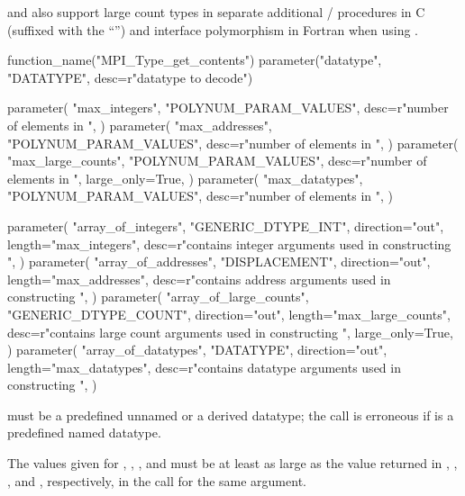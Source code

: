  and  also support large \gb{}count types in
separate additional \MPI/ procedures in C (suffixed with the ``'') and interface
polymorphism  in Fortran when using .

%
\begin{mpi-binding}
    function_name("MPI_Type_get_contents")
    parameter("datatype", "DATATYPE", desc=r"datatype to decode")

    parameter(
        "max_integers",
        "POLYNUM_PARAM_VALUES",
        desc=r"number of elements in ",
    )
    parameter(
        "max_addresses",
        "POLYNUM_PARAM_VALUES",
        desc=r"number of elements in ",
    )
    parameter(
        "max_large_counts",
        "POLYNUM_PARAM_VALUES",
        desc=r"number of elements in ",
        large_only=True,
    )
    parameter(
        "max_datatypes",
        "POLYNUM_PARAM_VALUES",
        desc=r"number of elements in ",
    )

    parameter(
        "array_of_integers",
        "GENERIC_DTYPE_INT",
        direction="out",
        length="max_integers",
        desc=r"contains integer arguments used in constructing ",
    )
    parameter(
        "array_of_addresses",
        "DISPLACEMENT",
        direction="out",
        length="max_addresses",
        desc=r"contains address arguments used in constructing ",
    )
    parameter(
        "array_of_large_counts",
        "GENERIC_DTYPE_COUNT",
        direction="out",
        length="max_large_counts",
        desc=r"contains large count arguments used in constructing ",
        large_only=True,
    )
    parameter(
        "array_of_datatypes",
        "DATATYPE",
        direction="out",
        length="max_datatypes",
        desc=r"contains datatype arguments used in constructing ",
    )
\end{mpi-binding}

 must be a predefined unnamed or a derived datatype;
the call is erroneous if  is a predefined named
datatype.

The values given for , ,
,
and 
must be at least as large as the value
returned in , ,
,
and ,
respectively, in the call 
for the same  argument.

